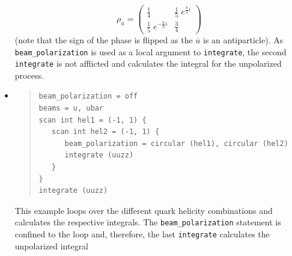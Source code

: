\documentclass[12pt]{book}
\newcommand{\ttt}[1]{\texttt{#1}}
\begin{document}
\begin{itemize}
{\[ \rho_{\overline{u}} = \begin{pmatrix}
\frac{1}{4} & \frac{1}{5}\;e^{\frac{\pi}{2}i} \\
\frac{1}{5}\;e^{-\frac{\pi}{2}i} & \frac{3}{4}
\end{pmatrix} \]
}
(note that the sign of the phase is flipped as the $\overline{u}$ is an
antiparticle). As \ttt{beam\_polarization} is used as a
local argument to \ttt{integrate}, the second \ttt{integrate} is not afflicted
and calculates the integral for the unpolarized process.
%
\item
\begin{quote}
\begin{footnotesize}
\begin{verbatim}
beam_polarization = off
beams = u, ubar
scan int hel1 = (-1, 1) {
   scan int hel2 = (-1, 1) {
      beam_polarization = circular (hel1), circular (hel2)
      integrate (uuzz)
   }
}
integrate (uuzz)
\end{verbatim}
\end{footnotesize}
\end{quote}
This example loops over the different quark helicity combinations and calculates
the respective integrals. The \ttt{beam\_polarization} statement is confined
to the loop and, therefore, the last \ttt{integrate} calculates the unpolarized
integral
\end{itemize}
%
\end{document}
